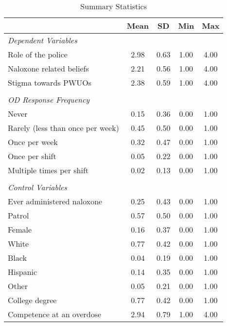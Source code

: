 \begin{table}[htbp]\centering
\def\sym#1{\ifmmode^{#1}\else\(^{#1}\)\fi}
\caption{\centering Summary Statistics}
\begin{tabular}{l*{1}{cccc}}
\toprule
                &     Mean&       SD&      Min&      Max\\
\midrule
\emph{Dependent Variables}&         &         &         &         \\
Role of the police&     2.98&     0.63&     1.00&     4.00\\
Naloxone related beliefs&     2.21&     0.56&     1.00&     4.00\\
Stigma towards PWUOs&     2.38&     0.59&     1.00&     4.00\\
\vspace{.05em} \\
\emph{OD Response Frequency}&         &         &         &         \\
Never           &     0.15&     0.36&     0.00&     1.00\\
Rarely (less than once per week)&     0.45&     0.50&     0.00&     1.00\\
Once per week   &     0.32&     0.47&     0.00&     1.00\\
Once per shift  &     0.05&     0.22&     0.00&     1.00\\
Multiple times per shift&     0.02&     0.13&     0.00&     1.00\\
\vspace{0.05em} \\
\emph{Control Variables}&         &         &         &         \\
Ever administered naloxone&     0.25&     0.43&     0.00&     1.00\\
Patrol          &     0.57&     0.50&     0.00&     1.00\\
Female          &     0.16&     0.37&     0.00&     1.00\\
White           &     0.77&     0.42&     0.00&     1.00\\
Black           &     0.04&     0.19&     0.00&     1.00\\
Hispanic        &     0.14&     0.35&     0.00&     1.00\\
Other           &     0.05&     0.21&     0.00&     1.00\\
College degree  &     0.77&     0.42&     0.00&     1.00\\
Competence at an overdose&     2.94&     0.79&     1.00&     4.00\\

\end{tabular}
\end{table}
